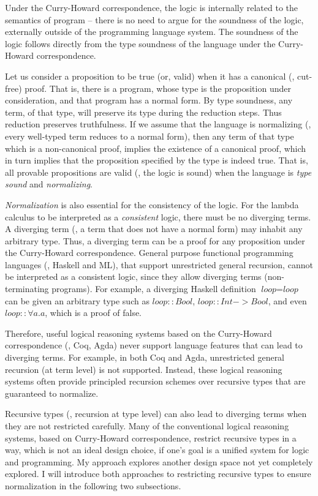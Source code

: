 Under the Curry-Howard correspondence, the logic is internally related to the
semantics of program -- there is no need to argue for the soundness of the
logic,  externally outside of the programming language system. The soundness
of the logic follows directly from the type soundness of the language under
the Curry-Howard correspondence.

Let us consider a proposition to be true
(or, valid) when it has a canonical (\ie, cut-free) proof.
That is, there is a program, whose type is the proposition under
consideration, and that program has a normal form. 
By type soundness, any term,
of that type, will preserve its type during the reduction steps. Thus
reduction preserves truthfulness. If we assume
that the language is normalizing (\ie, every well-typed term reduces to
a normal form), then any term of that type which is a non-canonical proof,
implies the existence of a canonical proof, which in turn implies that
the proposition specified by the type is indeed true. That is, all provable
propositions are valid (\ie, the logic is sound) when the language is
\emph{type sound} and \emph{normalizing}.

\emph{Normalization} is also essential for the consistency of the logic.
For the lambda calculus to be interpreted as a \emph{consistent} logic,
there must be no diverging terms. A diverging term (\ie, a term that does
not have a normal form) may inhabit any arbitrary type. Thus, a diverging term
can be a proof for any proposition under the Curry-Howard correspondence.
General purpose functional programming languages (\eg, Haskell and ML), that
support unrestricted general recursion, cannot be interpreted as a consistent
logic, since they allow diverging terms (non-terminating programs).
For example, a diverging Haskell definition $\textit{loop} = \textit{loop}$
can be given an arbitrary type such as
$\textit{loop}\mathrel{::}\textit{Bool}$,
$\textit{loop}\mathrel{::}\textit{Int} -> \textit{Bool}$,
and even $\textit{loop}\mathrel{::}\forall a. a$, which is a proof of false.


Therefore, useful logical reasoning systems based on the Curry-Howard
correspondence (\eg, Coq, Agda) never support language features that can
lead to diverging terms. For example, in both Coq and Agda,
unrestricted general recursion (at term level) is not supported. 
Instead, these logical reasoning systems
often provide principled recursion schemes over recursive types that are
guaranteed to normalize. 

Recursive types (\ie, recursion at type level)
can also lead to diverging terms when they are not restricted carefully.
Many of the conventional logical reasoning systems, based on
Curry-Howard correspondence, restrict recursive types in a way,
which is not an ideal design choice, if one's goal is a unified system for
logic and programming. My approach explores another design space not yet
completely explored. I will introduce both approaches to restricting recursive
types to ensure normalization in the following two subsections.

